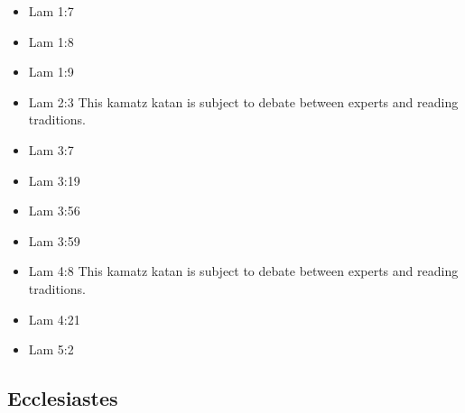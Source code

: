 \documentclass[14pt]{book}
\begin{document}
\begin{multicols}{2}\begin{itemize}
	
	\item Lam 1:7
	
	\item Lam 1:8
	
	\item Lam 1:9
	
	\item Lam 2:3 This kamatz katan is subject to debate between experts and reading traditions.
			
			\item Lam 3:7
			
			\item Lam 3:19
			
			\item Lam 3:56
			
			\item Lam 3:59
			
			\item Lam 4:8 This kamatz katan is subject to debate between experts and reading traditions.
			
			\item Lam 4:21
			
			\item Lam 5:2
			
		\end{itemize}\end{multicols}
	
\subsection{Ecclesiastes}
\end{document}
